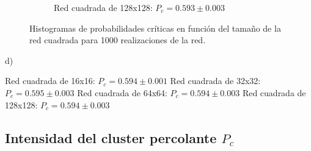\documentclass[%
 reprint,
 amsmath,amssymb,
 aps,
spanish]{revtex4-1}
\begin{document}
\begin{figure}[h]
\begin{subfigure}{.25\textwidth}
  \caption{Red cuadrada de 128x128: $P_c=0.593\pm0.003$}  
  \label{fig:1b128x128}
\end{subfigure}
\caption{Histogramas de probabilidades críticas en función del tamaño de la red cuadrada para 1000 realizaciones de la red.}
\label{fig:1b}
\end{figure}

d)

Red cuadrada de 16x16: $P_c=0.594\pm0.001$
Red cuadrada de 32x32: $P_c=0.595\pm0.003$
Red cuadrada de 64x64: $P_c=0.594\pm0.003$
Red cuadrada de 128x128: $P_c=0.594\pm0.003$

\subsection{\label{2} Intensidad del cluster percolante $P_c$}
\end{document}
